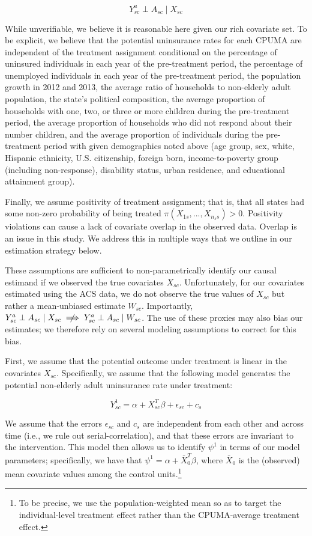 \documentclass[aoas]{imsart}
\theoremstyle{plain}
\theoremstyle{remark}
\begin{document}
$$
Y_{sc}^a \perp A_{sc} \mid X_{sc}
$$

While unverifiable, we believe it is reasonable here given our rich covariate set. To be explicit, we believe that the potential uninsurance rates for each CPUMA are independent of the treatment assignment conditional on the percentage of uninsured individuals in each year of the pre-treatment period, the percentage of unemployed individuals in each year of the pre-treatment period, the population growth in 2012 and 2013, the average ratio of households to non-elderly adult population, the state's political composition, the average proportion of households with one, two, or three or more children during the pre-treatment period, the average proportion of households who did not respond about their number children, and the average proportion of individuals during the pre-treatment period with given demographics noted above (age group, sex, white, Hispanic ethnicity, U.S. citizenship, foreign born, income-to-poverty group (including non-response), disability status, urban residence, and educational attainment group). 

Finally, we assume positivity of treatment assignment; that is, that all states had some non-zero probability of being treated $\pi(X_{1s}, ..., X_{n_ss}) > 0$. Positivity violations can cause a lack of covariate overlap in the observed data. Overlap is an issue in this study. We address this in multiple ways that we outline in our estimation strategy below. 

These assumptions are sufficient to non-parametrically identify our causal estimand if we observed the true covariates $X_{sc}$. Unfortunately, for our covariates estimated using the ACS data, we do not observe the true values of $X_{sc}$ but rather a mean-unbiased estimate $W_{sc}$. Importantly, $Y_{sc}^a \perp A_{sc} \mid X_{sc} \centernot\implies Y_{sc}^a \perp A_{sc} \mid W_{sc}$. The use of these proxies may also bias our estimates; we therefore rely on several modeling assumptions to correct for this bias.

First, we assume that the potential outcome under treatment is linear in the covariates $X_{sc}$. Specifically, we assume that the following model generates the potential non-elderly adult uninsurance rate under treatment:

$$
Y_{sc}^1 = \alpha + X_{sc}^T\beta + \epsilon_{sc} + c_s
$$

We assume that the errors $\epsilon_{sc}$ and $c_s$ are independent from each other and across time (i.e., we rule out serial-correlation), and that these errors are invariant to the intervention. This model then allows us to identify $\psi^1$ in terms of our model parameters; specifically, we have that $\psi^1 = \alpha + \bar{X}_0^T\beta$, where $\bar{X}_0$ is the (observed) mean covariate values among the control units.\footnote{To be precise, we use the population-weighted mean so as to target the individual-level treatment effect rather than the CPUMA-average treatment effect.} 
\end{document}
